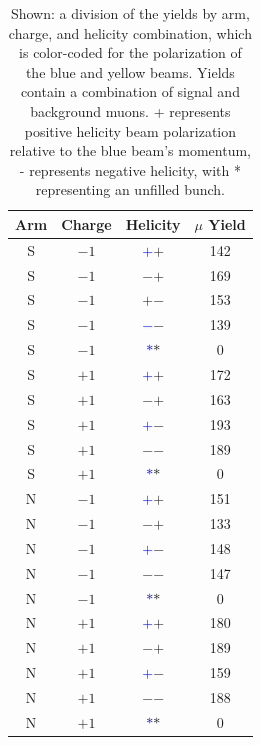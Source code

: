 \begin{table}
  \centering
  \begin{tabular}{cccc}
    \toprule
    \textbf{Arm} &
    \textbf{Charge} & 
    \textbf{Helicity} & 
    \textbf{$\mu$ Yield} \\ 
    \midrule
    S & $-1$ & \textbf{\textcolor{blue}{$+$}\textcolor{ucrgold}{$+$}}& 142 \\
    S & $-1$ & \textbf{\textcolor{blue}{$-$}\textcolor{ucrgold}{$+$}}& 169 \\
    S & $-1$ & \textbf{\textcolor{blue}{$+$}\textcolor{ucrgold}{$-$}}& 153 \\
    S & $-1$ & \textbf{\textcolor{blue}{$-$}\textcolor{ucrgold}{$-$}}& 139 \\
    S & $-1$ & \textbf{\textcolor{blue}{$*$}\textcolor{ucrgold}{$*$}}& 0 \\
    S & $+1$ & \textbf{\textcolor{blue}{$+$}\textcolor{ucrgold}{$+$}}& 172 \\
    S & $+1$ & \textbf{\textcolor{blue}{$-$}\textcolor{ucrgold}{$+$}}& 163 \\
    S & $+1$ & \textbf{\textcolor{blue}{$+$}\textcolor{ucrgold}{$-$}}& 193 \\
    S & $+1$ & \textbf{\textcolor{blue}{$-$}\textcolor{ucrgold}{$-$}}& 189 \\
    S & $+1$ & \textbf{\textcolor{blue}{$*$}\textcolor{ucrgold}{$*$}}& 0 \\
    N & $-1$ & \textbf{\textcolor{blue}{$+$}\textcolor{ucrgold}{$+$}}& 151 \\
    N & $-1$ & \textbf{\textcolor{blue}{$-$}\textcolor{ucrgold}{$+$}}& 133 \\
    N & $-1$ & \textbf{\textcolor{blue}{$+$}\textcolor{ucrgold}{$-$}}& 148 \\
    N & $-1$ & \textbf{\textcolor{blue}{$-$}\textcolor{ucrgold}{$-$}}& 147 \\
    N & $-1$ & \textbf{\textcolor{blue}{$*$}\textcolor{ucrgold}{$*$}}& 0 \\
    N & $+1$ & \textbf{\textcolor{blue}{$+$}\textcolor{ucrgold}{$+$}}& 180 \\
    N & $+1$ & \textbf{\textcolor{blue}{$-$}\textcolor{ucrgold}{$+$}}& 189 \\
    N & $+1$ & \textbf{\textcolor{blue}{$+$}\textcolor{ucrgold}{$-$}}& 159 \\
    N & $+1$ & \textbf{\textcolor{blue}{$-$}\textcolor{ucrgold}{$-$}}& 188 \\
    N & $+1$ & \textbf{\textcolor{blue}{$*$}\textcolor{ucrgold}{$*$}}& 0 \\
    \bottomrule
  \end{tabular}
  \caption{
    Shown: a division of the yields by arm, charge, and helicity combination,
    which is color-coded for the polarization of the blue and yellow beams.
    Yields contain a combination of signal and background muons. + represents
    positive helicity beam polarization relative to the blue beam's momentum, -
    represents negative helicity, with * representing an unfilled bunch.
  }
  \label{tab:sorted_muons_standard}
\end{table}

